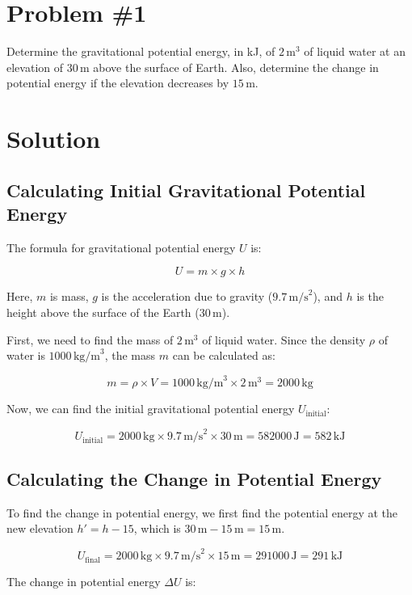 \documentclass[12pt]{article}
\begin{document}
\section*{Problem \#1}
Determine the gravitational potential energy, in kJ, of \(2 \, \text{m}^3\) of liquid water at an elevation of \(30 \, \text{m}\) above the surface of Earth. Also, determine the change in potential energy if the elevation decreases by \(15 \, \text{m}\).

\section*{Solution}

\subsection*{Calculating Initial Gravitational Potential Energy}
The formula for gravitational potential energy \(U\) is:

\[
U = m \times g \times h
\]

Here, \(m\) is mass, \(g\) is the acceleration due to gravity (\(9.7 \, \text{m/s}^2\)), and \(h\) is the height above the surface of the Earth (\(30 \, \text{m}\)).

First, we need to find the mass of \(2 \, \text{m}^3\) of liquid water. Since the density \(\rho\) of water is \(1000 \, \text{kg/m}^3\), the mass \(m\) can be calculated as:

\[
m = \rho \times V = 1000 \, \text{kg/m}^3 \times 2 \, \text{m}^3 = 2000 \, \text{kg}
\]

Now, we can find the initial gravitational potential energy \(U_{\text{initial}}\):

\[
U_{\text{initial}} = 2000 \, \text{kg} \times 9.7 \, \text{m/s}^2 \times 30 \, \text{m} = 582000 \, \text{J} = 582 \, \text{kJ}
\]

\subsection*{Calculating the Change in Potential Energy}

To find the change in potential energy, we first find the potential energy at the new elevation \(h' = h - 15\), which is \(30 \, \text{m} - 15 \, \text{m} = 15 \, \text{m}\).

\[
U_{\text{final}} = 2000 \, \text{kg} \times 9.7 \, \text{m/s}^2 \times 15 \, \text{m} = 291000 \, \text{J} = 291 \, \text{kJ}
\]

The change in potential energy \(\Delta U\) is:
\end{document}
